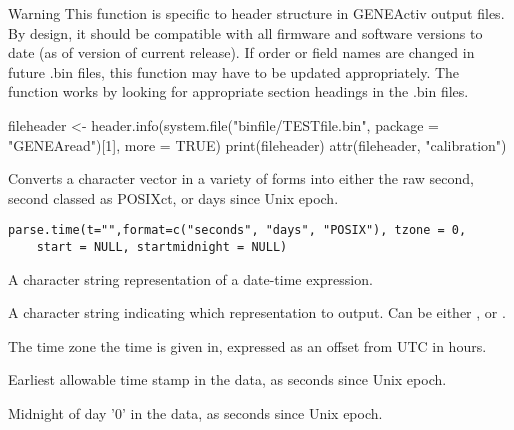 \documentclass[a4paper]{book}
\begin{document}
%
\begin{Section}{Warning}
This function is specific to header structure in GENEActiv output files. By design, it should be compatible with all firmware and software versions to date (as of version of current release). If order or field names are changed in future .bin files, this function may have to be updated appropriately.
The function works by looking for appropriate section headings in the .bin files.
\end{Section}
%
\begin{SeeAlso}\relax
{}
\end{SeeAlso}
%
\begin{Examples}
\begin{ExampleCode}

fileheader <- header.info(system.file("binfile/TESTfile.bin", package = "GENEAread")[1], more = TRUE)
print(fileheader)
attr(fileheader, "calibration")
\end{ExampleCode}
\end{Examples}
%
\begin{Description}\relax
Converts a character vector in a variety of forms into either the raw second, second classed as POSIXct, or days since Unix epoch.
\end{Description}
%
\begin{Usage}
\begin{verbatim}
parse.time(t="",format=c("seconds", "days", "POSIX"), tzone = 0, 
	start = NULL, startmidnight = NULL)
\end{verbatim}
\end{Usage}
%
\begin{Arguments}
\begin{ldescription}
\item[\code{t}] A character string representation of a date-time expression.
\item[\code{format}] A character string indicating which representation to output.  Can be either ,  or .
\item[\code{tzone}] The time zone the time is given in, expressed as an offset from UTC in hours.
\item[\code{start}] Earliest allowable time stamp in the data, as seconds since Unix epoch.
\item[\code{startmidnight}] Midnight of day '0' in the data, as seconds since Unix epoch.
\end{ldescription}
\end{Arguments}
\end{document}
